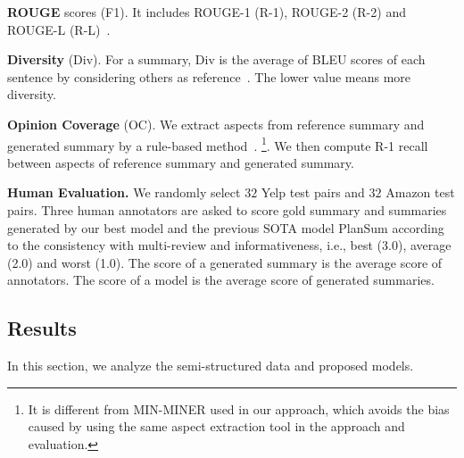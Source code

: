 \textbf{ROUGE} scores (F1). It includes
ROUGE-1 (R-1), ROUGE-2 (R-2) and
ROUGE-L (R-L)~\cite{rouge}.


\textbf{Diversity} (Div). 
For a summary, Div is the average of BLEU scores of each sentence by considering others as reference~\cite{SelfBleu18}. 
The lower value means more diversity.

\textbf{Opinion Coverage} (OC).
We extract aspects from reference summary and 
generated summary 
by a rule-based method~\cite{aspect14}.
\footnote{It is different from MIN-MINER used in our approach,
	which avoids the bias caused by using the same aspect extraction tool in the approach and evaluation.}.
We then compute R-1 recall between aspects of reference summary and generated summary.

\textbf{Human Evaluation.}
We randomly select $32$ Yelp test pairs 
and $32$ Amazon test pairs.
Three human annotators are asked
to score gold summary and summaries 
generated by our best model and 
the previous SOTA model PlanSum according to the consistency with multi-review and informativeness,
i.e., best (3.0), average (2.0) and worst (1.0).
The score of a generated summary is the average score of annotators.
The score of a model is the average score of generated summaries.


\subsection{Results}
\label{sec:results}
In this section, we analyze the semi-structured data  and 
proposed models.

